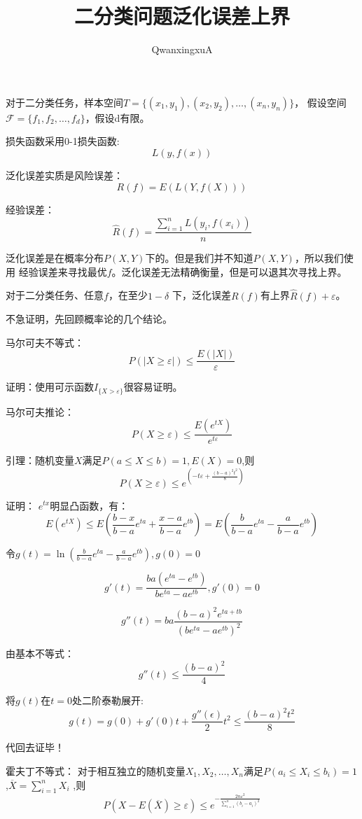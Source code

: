 \documentclass{article}
\author{QwanxingxuA}
\title{二分类问题泛化误差上界}
\begin{document}
\maketitle

对于二分类任务，样本空间$T=\{(x_1,y_1),(x_2,y_2),\dots,(x_n,y_n)\}$，
假设空间$\mathcal{F}=\{f_1,f_2,\dots,f_d\}$，假设d有限。

损失函数采用0-1损失函数:
\[L(y,f(x))\]

泛化误差实质是风险误差：
\[R(f)=E(L(Y,f(X)))\]

经验误差：\[\widehat{R}(f)=\frac{\sum_{i=1}^{n}L(y_i,f(x_i))}{n}\] 

泛化误差是在概率分布$P(X,Y)$下的。但是我们并不知道$P(X,Y)$，所以我们使用
经验误差来寻找最优$f$。泛化误差无法精确衡量，但是可以退其次寻找上界。

对于二分类任务、任意$f$，在至少$1-\delta$ 下，泛化误差$R(f)
$有上界$\widehat{R}(f)+\varepsilon $。

不急证明，先回顾概率论的几个结论。

马尔可夫不等式：
\[P(\left\lvert X \ge \varepsilon \right\rvert )\le \frac{E(\left\lvert X\right\rvert )}{\varepsilon }\]

证明：使用可示函数$I_{\{X>\varepsilon \}}$很容易证明。

马尔可夫推论：
\[P(X \ge \varepsilon )\le \frac{E(e^{tX})}{e^{t\varepsilon }}\]

引理：随机变量$X$满足$P(a\le X \le b)=1,E(X)=0$,则\[P(X\ge\varepsilon )
\le e^{(-t\varepsilon +\frac{{(b-a)}^2t^2}{8})}\]


证明：
$e^{tx}$明显凸函数，有：
\[E(e^{tX})\le E(\frac{b-x}{b-a} e^{ta}+\frac{x-a}{b-a}e^{tb})
=E(\frac{b}{b-a}e^{ta}-\frac{a}{b-a}e^{tb})\]

令$g(t)=\ln{(\frac{b}{b-a}e^{ta}-\frac{a}{b-a}e^{tb})},g(0)=0$

\[g'(t)=\frac{ba(e^{ta}-e^{tb})}{be^{ta}-ae^{tb}},g'(0)=0\]

\[g''(t)=ba\frac{(b-a)^2e^{ta+tb}}{(be^{ta}-ae^{tb})^2}\]

由基本不等式：
\[g''(t) \le \frac{(b-a)^2}{4}\]

将$g(t)$在$t=0$处二阶泰勒展开:
\[g(t)=g(0)+g'(0)t+\frac{g''(\epsilon )}{2}t^2 \le \frac{(b-a)^2t^2}{8}\]


代回去证毕！

霍夫丁不等式：
对于相互独立的随机变量$X_1,X_2,\dots,X_n$满足$P(a_i \le X_i \le b_i)=1$,$\overline{X}=\sum_{i=1}^{n}X_i$ ,则
\[P(X-E(\overline{X}) \ge \varepsilon ) \le e^{-\frac{2n\varepsilon ^2}{\sum_{i=1}^{n}(b_i-a_i)^2}}\]
\end{document}
